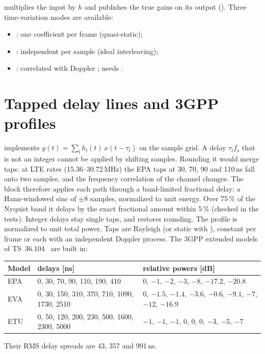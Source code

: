 \begin{incode}
 multiplies the input by $h$ and publishes the true gains on its 
output (). Three time-variation modes are available:
\begin{itemize}
  \item {}: one coefficient per frame (quasi-static);
  \item {}: independent per sample (ideal interleaving);
  \item {}: correlated with Doppler ; needs .
\end{itemize}
\end{incode}

\section{Tapped delay lines and 3GPP profiles}
 implements $y(t)=\sum_l h_l(t)\,x(t-\tau_l)$ on the sample grid. A delay
$\tau_lf_s$ that is not an integer cannot be applied by shifting samples. Rounding it would merge
taps: at LTE rates (15.36--30.72\,MHz) the EPA taps at 30, 70, 90 and 110\,ns fall onto two
samples, and the frequency correlation of the channel changes. The block therefore applies each
path through a band-limited fractional delay: a Hann-windowed sinc of $\pm8$ samples, normalized
to unit energy. Over 75\,\% of the Nyquist band it delays by the exact fractional amount within
5\,\% (checked in the tests). Integer delays stay single taps, and 
restores rounding. The profile is normalized to unit total power. Taps are Rayleigh (or static
with ), constant per frame or each with an independent Doppler
process. The 3GPP extended models of TS~36.104~\cite{3gpp36104} are built in:

\begin{center}\small
\begin{tabular}{@{}lll@{}}
\toprule
Model & delays [ns] & relative powers [dB]\\
\midrule
EPA & 0, 30, 70, 90, 110, 190, 410 & 0, $-1$, $-2$, $-3$, $-8$, $-17.2$, $-20.8$\\
EVA & 0, 30, 150, 310, 370, 710, 1090, 1730, 2510 & 0, $-1.5$, $-1.4$, $-3.6$, $-0.6$, $-9.1$, $-7$, $-12$, $-16.9$\\
ETU & 0, 50, 120, 200, 230, 500, 1600, 2300, 5000 & $-1$, $-1$, $-1$, 0, 0, 0, $-3$, $-5$, $-7$\\
\bottomrule
\end{tabular}
\end{center}
Their RMS delay spreads are 43, 357 and 991\,ns.

